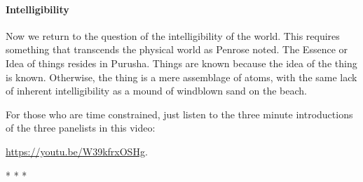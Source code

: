\paragraph{Intelligibility}
Now we return to the question of the intelligibility of the world. This requires something that transcends the physical world as Penrose noted. The Essence or Idea of things resides in Purusha. Things are known because the idea of the thing is known. Otherwise, the thing is a mere assemblage of atoms, with the same lack of inherent intelligibility as a mound of windblown sand on the beach.

For those who are time constrained, just listen to the three minute introductions of the three panelists in this video: 

\url{https://youtu.be/W39kfrxOSHg}.


\begin{center}* * *\end{center}

